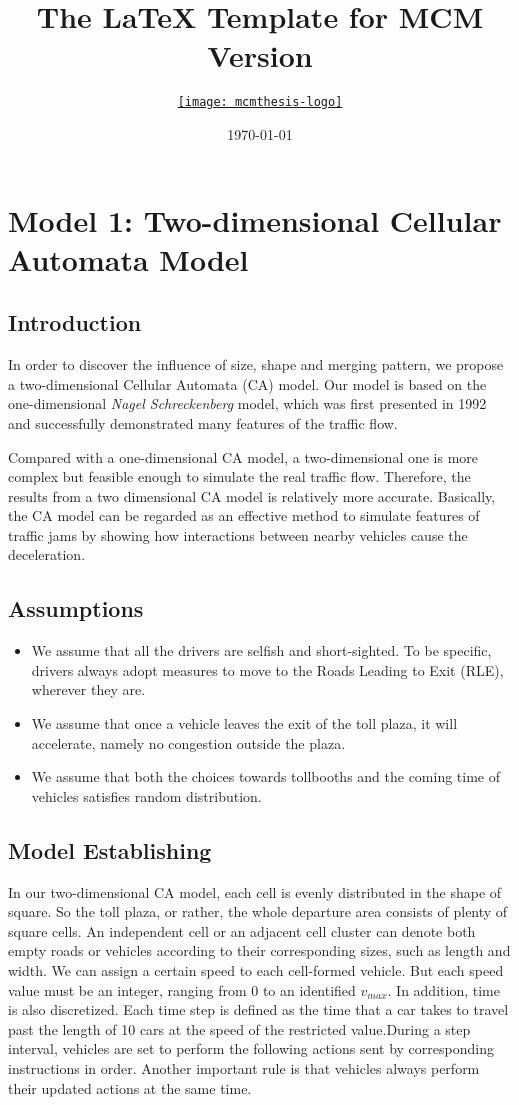 \documentclass{mcmthesis}
\title{The \LaTeX{} Template for MCM Version \MCMversion}
\author{\small \href{http://www.latexstudio.net/}
  {\texttt{[image: mcmthesis-logo]}}}
\date{\today}
\begin{document}
\section{Model 1: Two-dimensional Cellular Automata Model}
\subsection{Introduction}
In order to discover the influence of size, shape and merging pattern, we
 propose a two-dimensional Cellular Automata (CA) model. Our model is based on
 the one-dimensional \emph{Nagel Schreckenberg} model, which was first presented in
 1992 and successfully demonstrated many features of the traffic flow.

 Compared with a one-dimensional CA model, a two-dimensional one is more complex
 but feasible enough to simulate the real traffic flow. Therefore, the results
 from a two dimensional CA model is relatively more accurate.  Basically,
 the CA model can be regarded as an effective method to simulate features of
 traffic jams by showing how interactions between nearby vehicles cause the
 deceleration.
\subsection{Assumptions}
\begin{itemize}
\item We assume that all the drivers are selfish
and short-sighted. To be specific, drivers always
adopt measures to move to the Roads Leading to Exit
(RLE), wherever they are.
\item We assume that once a vehicle leaves the
exit of the toll plaza, it will accelerate, namely
no congestion outside the plaza.
\item We assume that both the choices
towards tollbooths and the coming time of
vehicles satisfies random distribution.
\end{itemize}
\subsection{Model Establishing}
 In our two-dimensional CA model, each cell is
 evenly distributed in the shape of square. So the
 toll plaza, or rather, the whole departure area
 consists of plenty of square cells.
An independent cell or an adjacent cell cluster
can denote both empty roads or vehicles according
to their corresponding sizes, such as length and width.
We can assign a certain speed to each cell-formed vehicle.
But each speed value must be an integer, ranging from 0
to an identified $v_{max}$.
In addition, time is also discretized. Each time step
is defined as the time that a car takes to travel past
the length of 10 cars at the speed of the restricted
value.During a step interval, vehicles are set to perform
the following actions sent by corresponding instructions
in order.
Another important rule is that vehicles always perform
their updated actions at the same time.
\end{document}
